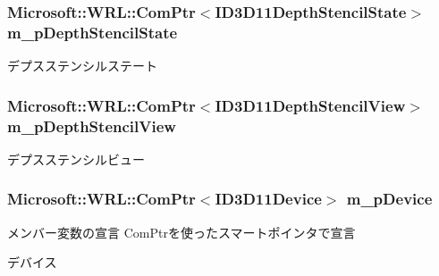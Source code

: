 \subsubsection[{\texorpdfstring{m\+\_\+p\+Depth\+Stencil\+State}{m_pDepthStencilState}}]{\setlength{\rightskip}{0pt plus 5cm}Microsoft\+::\+W\+R\+L\+::\+Com\+Ptr$<$I\+D3\+D11\+Depth\+Stencil\+State$>$ m\+\_\+p\+Depth\+Stencil\+State\hspace{0.3cm}{\ttfamily [private]}}\hypertarget{class_d3_d11_1_1_direct3_d11_a20316c9265ff7890678f87d99ba824c8}{}\label{class_d3_d11_1_1_direct3_d11_a20316c9265ff7890678f87d99ba824c8}
デプスステンシルステート 
\subsubsection[{\texorpdfstring{m\+\_\+p\+Depth\+Stencil\+View}{m_pDepthStencilView}}]{\setlength{\rightskip}{0pt plus 5cm}Microsoft\+::\+W\+R\+L\+::\+Com\+Ptr$<$I\+D3\+D11\+Depth\+Stencil\+View$>$ m\+\_\+p\+Depth\+Stencil\+View\hspace{0.3cm}{\ttfamily [private]}}\hypertarget{class_d3_d11_1_1_direct3_d11_aaf400f9f61eb658eafd0ca0c07bce101}{}\label{class_d3_d11_1_1_direct3_d11_aaf400f9f61eb658eafd0ca0c07bce101}
デプスステンシルビュー 
\subsubsection[{\texorpdfstring{m\+\_\+p\+Device}{m_pDevice}}]{\setlength{\rightskip}{0pt plus 5cm}Microsoft\+::\+W\+R\+L\+::\+Com\+Ptr$<$I\+D3\+D11\+Device$>$ m\+\_\+p\+Device\hspace{0.3cm}{\ttfamily [private]}}\hypertarget{class_d3_d11_1_1_direct3_d11_a76be9b3348b0abf14aaf6fc74f1c6ce8}{}\label{class_d3_d11_1_1_direct3_d11_a76be9b3348b0abf14aaf6fc74f1c6ce8}


メンバー変数の宣言  Com\+Ptrを使ったスマートポインタで宣言 

デバイス 
